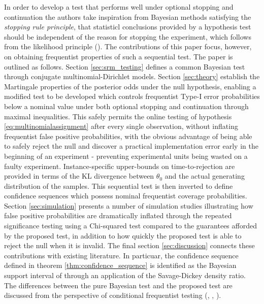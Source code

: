 \documentclass[11pt]{article}
\begin{document}
In order to develop a test that performs well under optional stopping and continuation the authors take inspiration from Bayesian methods satisfying the \textit{stopping rule principle}, that statisticl conclusions provided by a hypothesis test should be independent of the reason for stopping the experiment, which follows from the likelihood principle (\cite{likelihood}). The contributions of this paper focus, however, on obtaining frequentist properties of such a sequential test.
The paper is outlined as follows. Section \ref{sec:srm_testing} defines a common Bayesian test through conjugate multinomial-Dirichlet models. Section \ref{sec:theory} establish the Martingale properties of the posterior odds under the null hypothesis, enabling a modified test to be developed which controls frequentist Type-I error probabilities below a nominal value under both optional stopping and continuation through maximal inequalities.  This safely permits the online testing of hypothesis \eqref{eq:multinomialassignment} after every single observation, without inflating frequentist false positive probabilities, with the obvious advantage of being able to safely reject the null and discover a practical implementation error early in the beginning of an experiment - preventing experimental units being wasted on a faulty experiment. Instance-specific upper-bounds on time-to-rejection are provided in terms of the KL divergence  between $\theta_0$ and the actual generating distribution of the samples. This sequential test is then inverted to define confidence sequences which possess nominal frequentist coverage probabilities. Section \ref{sec:simulation} presents a number of simulation studies illustrating how false positive probabilities are dramatically inflated through the repeated significance testing using a Chi-squared test compared to the guarantees afforded by the proposed test, in addition to how quickly the proposed test is able to reject the null when it is invalid. The final section \ref{sec:discussion} connects these contributions with existing literature. In particuar, the confidence sequence defined in theorem \ref{thm:confidence_sequence} is identified as the Bayesian support interval of \cite{support_interval} through an application of the Savage-Dickey density ratio. The differences between the pure Bayesian test and the proposed test are discussed from the perspective of conditional frequentist testing (\cite{conditional_frequentist_simple}, \cite{conditional_frequentist_precise}, \cite{conditional_frequentist_composite}).
\end{document}
